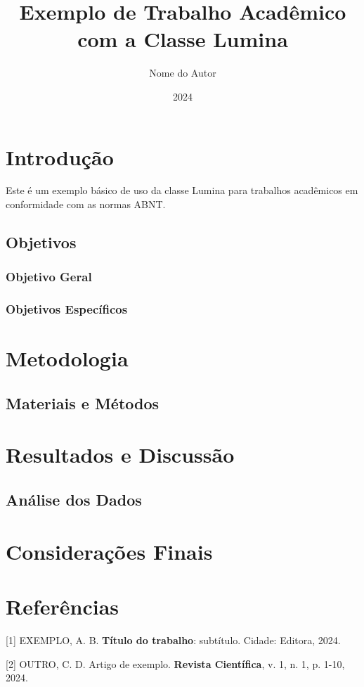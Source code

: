 \documentclass[
    fonte=TimesNewRoman,    %
    nbr6024=2012,          %
    layout=thesis,         %
    estilocaso=all         %
]{lumina}
\title{Exemplo de Trabalho Acadêmico com a Classe Lumina}
\author{Nome do Autor}
\date{2024}
\begin{document}
\capa
\folhaderosto

\tableofcontents
\clearpage

\chapter{Introdução}

\lipsum[1-2]

Este é um exemplo básico de uso da classe Lumina para trabalhos acadêmicos em conformidade com as normas ABNT.

\section{Objetivos}

\lipsum[3]

\subsection{Objetivo Geral}

\lipsum[4]

\subsection{Objetivos Específicos}

\lipsum[5]

\chapter{Metodologia}

\lipsum[6-8]

\section{Materiais e Métodos}

\lipsum[9-10]

\chapter{Resultados e Discussão}

\lipsum[11-13]

\section{Análise dos Dados}

\lipsum[14-15]

\chapter{Considerações Finais}

\lipsum[16-17]

\chapter*{Referências}

[1] EXEMPLO, A. B. \textbf{Título do trabalho}: subtítulo. Cidade: Editora, 2024.

[2] OUTRO, C. D. Artigo de exemplo. \textbf{Revista Científica}, v. 1, n. 1, p. 1-10, 2024.
\end{document}
